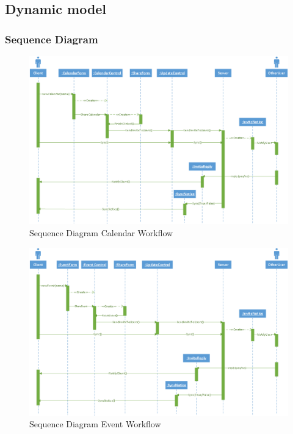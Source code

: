 \newpage
\subsection*{Dynamic model}
\subsubsection*{Sequence Diagram}

\begin{figure}[ht!]
\centering
\includegraphics[width=160mm]{scalendar.png}
\caption{Sequence Diagram Calendar Workflow  \label{overflow}}
\end{figure}

\newpage
\begin{figure}[ht!]
\centering
\includegraphics[width=160mm]{sevent.png}
\caption{Sequence Diagram Event Workflow  \label{overflow}}
\end{figure} 


